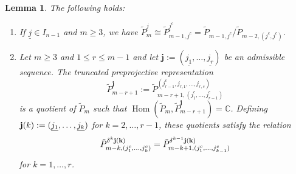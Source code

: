 \documentclass{amsart}
\newtheorem{lemma}[theorem]{Lemma}
\newcommand{\uj}{\underline j}
\newcommand{\CC}{\mathbb{C}}
\newcommand{\Hom}{\operatorname{Hom}}
\begin{document}
\begin{lemma}The following holds:
  \label{le:preprojective lifts}
  \begin{enumerate}
    \item If $\uj\in I_{n-1}$ and $m\geq 3$, we have $\tilde P_{m}^{\uj}\cong \tilde P_{m-1,j^c}^{\uj^c}= \tilde P_{m-1,j^c}/\tilde P_{m-2,(j^c,j^c)}$.
		\item Let $m\geq 3$ and $1\leq r\leq m-1$ and let $\mathbf j:=(\underline{j_1},\ldots,\underline{j_r})$ be an admissible sequence. The truncated preprojective representation
		$$\tilde P^{\mathbf j}_{m-r+1}:=\tilde P_{m-r+1,(j_1^c,\ldots,j_{r-1}^c)}^{(j_{r-1}^c,j_{r,1},\ldots,j_{r,s})}$$
	 is a quotient of $\tilde P_m$ such that $\Hom(\tilde P_m,\tilde P^{\mathbf j}_{m-r+1})=\CC$. Defining ${\bf j}(k):=(\underline{j_1},\ldots,\underline{j_k})$ for $k=2,\ldots,r-1$, these quotients satisfy the relation
		\[\tilde P_{m-k,(j_1^c,\ldots,j_k^c)}^{\delta^k{\bf j(k)}}=\tilde P_{m-k+1,(j_1^c,\ldots,j_{k-1}^c)}^{\delta^{k-1}\bf j(k)}\]
		for $k=1,\ldots,r$.
  \end{enumerate}
\end{lemma}
\end{document}
